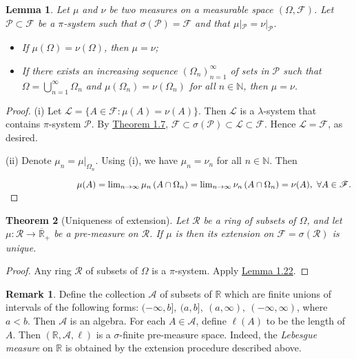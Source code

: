 \documentclass{article}
\numberwithin{equation}{section}
\theoremstyle{plain}
\newtheorem{theorem}{Theorem}[section]
\newtheorem{lemma}[theorem]{Lemma}
\theoremstyle{definition}
\newtheorem*{remark}{Remark}
\begin{document}
\begin{lemma}\label{lemma:1.22} Let $\mu$ and $\nu$ be two measures on a measurable space $(\Omega,\mathscr{F})$. Let $\mathscr{P}\subset\mathscr{F}$ be a $\pi$-system such that $\sigma(\mathscr{P})=\mathscr{F}$ and that $\mu|_\mathscr{P}=\nu|_\mathscr{P}$.
\begin{itemize}
	\item[(i)] If $\mu(\Omega)=\nu(\Omega)$, then $\mu=\nu$;
	\item[(ii)] If there exists an increasing sequence $(\Omega_n)_{n=1}^\infty$ of sets in $\mathscr{P}$ such that $\Omega=\bigcup_{n=1}^\infty\Omega_n$ and $\mu(\Omega_n)=\nu(\Omega_n)$ for all $n\in\mathbb{N}$, then $\mu=\nu$.
\end{itemize}
\end{lemma}
\begin{proof}
(i) Let $\mathscr{L}=\{A\in\mathscr{F}:\mu(A)=\nu(A)\}$. Then $\mathscr{L}$ is a $\lambda$-system that contains $\pi$-system $\mathscr{P}$. By \hyperref[thm:1.7]{Theorem 1.7}, $\mathscr{F}\subset\sigma(\mathscr{P})\subset\mathscr{L}\subset\mathscr{F}$. Hence $\mathscr{L}=\mathscr{F}$, as desired.

(ii) Denote $\mu_n=\mu|_{\Omega_n}$. Using (i), we have $\mu_n=\nu_n$ for all $n\in\mathbb{N}$. Then \vspace{0.3cm}

$\hspace{2.75cm}\mu(A) = \lim_{n\to\infty}\mu_n\left(A\cap\Omega_n\right) = \lim_{n\to\infty}\nu_n\left(A\cap\Omega_n\right) = \nu(A),\ \forall A\in\mathscr{F}.\vspace{0.2cm}$
\end{proof}

\begin{theorem}[Uniqueness of extension]\label{thm:1.23} Let $\mathscr{R}$ be a ring of subsets of $\Omega$, and let $\mu:\mathscr{R}\to\overline{\mathbb{R}}_+$ be a pre-measure on $\mathscr{R}$. If $\mu$ is  then its extension on $\mathscr{F}=\sigma(\mathscr{R})$ is unique.
\end{theorem}
\begin{proof}
Any ring $\mathscr{R}$ of subsets of $\Omega$ is a $\pi$-system. Apply \hyperref[lemma:1.22]{Lemma 1.22}.
\end{proof}

\begin{remark}
	Define the collection $\mathscr{A}$ of subsets of $\mathbb{R}$ which are finite unions of intervals of the following forms: $(-\infty,b],\ (a,b],\ (a,\infty),\ (-\infty,\infty)$, where $a<b$. Then $\mathscr{A}$ is an algebra. For each $A\in\mathscr{A}$, define $\ell(A)$ to be the length of $A$. Then $(\mathbb{R},\mathscr{A},\ell)$ is a $\sigma$-finite pre-measure space. Indeed, the \textit{Lebesgue measure} on $\mathbb{R}$ is obtained by the extension procedure described above.
\end{remark}
\end{document}
